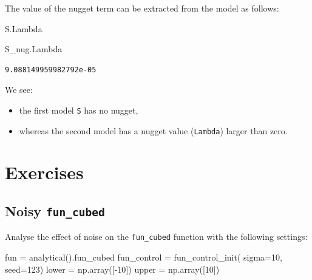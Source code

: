 \documentclass[
  letterpaper,
  DIV=11,
  numbers=noendperiod]{scrreprt}
\newenvironment{Shaded}{\begin{snugshade}}{\end{snugshade}}
\newcommand{\DecValTok}[1]{\textcolor[rgb]{0.68,0.00,0.00}{#1}}
\newcommand{\NormalTok}[1]{\textcolor[rgb]{0.00,0.23,0.31}{#1}}
\newcommand{\OperatorTok}[1]{\textcolor[rgb]{0.37,0.37,0.37}{#1}}
\providecommand{\tightlist}{%
  \setlength{\itemsep}{0pt}\setlength{\parskip}{0pt}}\usepackage{longtable,booktabs,array}
\begin{document}
The value of the nugget term can be extracted from the model as follows:

\begin{Shaded}
\begin{Highlighting}[]
\NormalTok{S.Lambda}
\end{Highlighting}
\end{Shaded}

\begin{Shaded}
\begin{Highlighting}[]
\NormalTok{S\_nug.Lambda}
\end{Highlighting}
\end{Shaded}

\begin{verbatim}
9.088149959982792e-05
\end{verbatim}

We see:

\begin{itemize}
\tightlist
\item
  the first model \texttt{S} has no nugget,
\item
  whereas the second model has a nugget value (\texttt{Lambda}) larger
  than zero.
\end{itemize}

\hypertarget{exercises-7}{%
\section{Exercises}\label{exercises-7}}

\hypertarget{noisy-fun_cubed-1}{%
\subsection{\texorpdfstring{Noisy
\texttt{fun\_cubed}}{Noisy fun\_cubed}}\label{noisy-fun_cubed-1}}

Analyse the effect of noise on the \texttt{fun\_cubed} function with the
following settings:

\begin{Shaded}
\begin{Highlighting}[]
\NormalTok{fun }\OperatorTok{=}\NormalTok{ analytical().fun\_cubed}
\NormalTok{fun\_control }\OperatorTok{=}\NormalTok{ fun\_control\_init(    }
\NormalTok{    sigma}\OperatorTok{=}\DecValTok{10}\NormalTok{,}
\NormalTok{    seed}\OperatorTok{=}\DecValTok{123}\NormalTok{)}
\NormalTok{lower }\OperatorTok{=}\NormalTok{ np.array([}\OperatorTok{{-}}\DecValTok{10}\NormalTok{])}
\NormalTok{upper }\OperatorTok{=}\NormalTok{ np.array([}\DecValTok{10}\NormalTok{])}
\end{Highlighting}
\end{Shaded}
\end{document}
